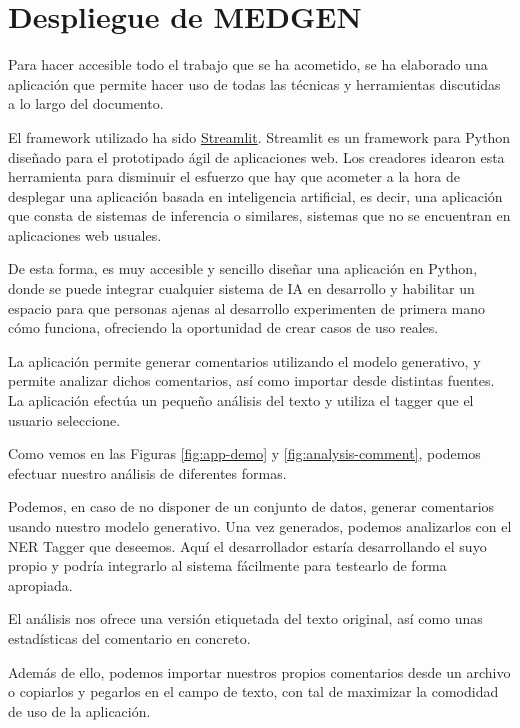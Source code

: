 \section{Despliegue de MEDGEN}

Para hacer accesible todo el trabajo que se ha acometido, se ha elaborado una aplicación que permite hacer uso de todas las técnicas y herramientas discutidas a lo largo del documento. 

El framework utilizado ha sido \href{https://streamlit.io}{Streamlit}. Streamlit es un framework para Python diseñado para el prototipado ágil de aplicaciones web. Los creadores idearon esta herramienta para disminuir el esfuerzo que hay que acometer a la hora de desplegar una aplicación basada en inteligencia artificial, es decir, una aplicación que consta de sistemas de inferencia o similares, sistemas que no se encuentran en aplicaciones web usuales. 

De esta forma, es muy accesible y sencillo diseñar una aplicación en Python, donde se puede integrar cualquier sistema de IA en desarrollo y habilitar un espacio para que personas ajenas al desarrollo experimenten de primera mano cómo funciona, ofreciendo la oportunidad de crear casos de uso reales.

La aplicación permite generar comentarios utilizando el modelo generativo, y permite analizar dichos comentarios, así como importar desde distintas fuentes. La aplicación efectúa un pequeño análisis del texto y utiliza el tagger que el usuario seleccione.


Como vemos en las Figuras \ref{fig:app-demo} y \ref{fig:analysis-comment}, podemos efectuar nuestro análisis de diferentes formas.

Podemos, en caso de no disponer de un conjunto de datos, generar comentarios usando nuestro modelo generativo. Una vez generados, podemos analizarlos con el NER Tagger que deseemos. Aquí el desarrollador estaría desarrollando el suyo propio y podría integrarlo al sistema fácilmente para testearlo de forma apropiada. 

El análisis nos ofrece una versión etiquetada del texto original, así como unas estadísticas del comentario en concreto.

Además de ello, podemos importar nuestros propios comentarios desde un archivo o copiarlos y pegarlos en el campo de texto, con tal de maximizar la comodidad de uso de la aplicación.

